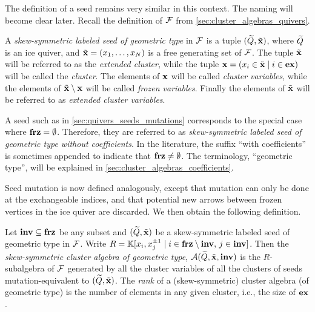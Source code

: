 The definition of a seed remains very similar in this context. The naming will become
clear later. Recall the definition of $\mathcal{F}$ from \cref{sec:cluster_algebras_quivers}.
\begin{definition}

	A \emph{skew-symmetric labeled seed of geometric type} in $\mathcal{F}$ is a tuple $(\widetilde{Q}, \tilde{\mathbf{x}})$, where $\widetilde{Q}$ is an ice quiver, and
	$\tilde{\mathbf{x}} = (x_1, \dots, x_N)$ is a free generating set of $\mathcal{F}$. The tuple $\tilde{\mathbf{x}}$ will be
	referred to as the \emph{extended cluster}, while the tuple
	$\mathbf{x} = (x_i \in \tilde{\mathbf{x}} \mid i \in \mathbf{ex})$ will be called the \emph{cluster}. The elements
	of $\mathbf{x}$ will be called \emph{cluster variables}, while the
	elements of $\tilde{\mathbf{x}} \setminus \mathbf{x}$ will be called \emph{frozen variables}. Finally the
	elements of $\tilde{\mathbf{x}}$ will be referred to as \emph{extended cluster variables}.
\end{definition}

A seed such as in \cref{sec:quivers_seeds_mutations} corresponds to the special case
where $\mathbf{frz} = \emptyset$. Therefore, they are referred to as \emph{skew-symmetric
	labeled seed of geometric type without coefficients}. In the literature, the suffix
``with coefficients'' is sometimes appended to indicate that $\mathbf{frz} \neq \emptyset$. The
terminology, ``geometric type'', will be explained in
\cref{sec:cluster_algebras_coefficients}.

Seed mutation is now defined analogously, except that mutation can only be done at the
exchangeable indices, and that potential new arrows between frozen vertices in the ice
quiver are discarded. We then obtain the following definition.
\begin{definition}\label{def:skew_symmetric_cluster_algebra}

	Let $\mathbf{inv} \subseteq \mathbf{frz}$ be any subset and $(\widetilde{Q}, \tilde{\mathbf{x}})$ be a skew-symmetric labeled
	seed of geometric type in $\mathcal{F}$. Write $R = \mathbb{K}[x_i, x_j^{\pm 1} \mid i \in \mathbf{frz}
		\setminus \mathbf{inv},\, j \in \mathbf{inv}]$. Then the \emph{skew-symmetric cluster algebra of
		geometric type}, $\mathcal{A}(\widetilde{Q},
		\tilde{\mathbf{x}}, \mathbf{inv})$ is the $R$-subalgebra of
	$\mathcal{F}$ generated by all the cluster variables of all the clusters of seeds
	mutation-equivalent to $(\widetilde{Q}, \tilde{\mathbf{x}})$. The \emph{rank} of a
	(skew-symmetric) cluster algebra (of geometric type) is the number of elements in any given cluster, i.e., the size of
	$\mathbf{ex}$.
\end{definition}

